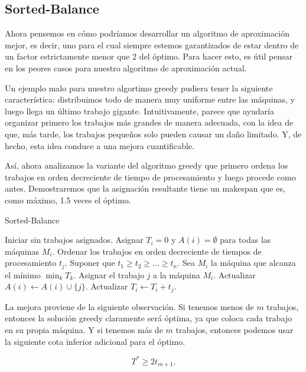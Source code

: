 \documentclass{report}
\begin{document}
	
	\subsection*{Sorted-Balance}
	
	Ahora pensemos en cómo podríamos desarrollar un algoritmo de aproximación mejor, es decir, uno para el cual siempre estemos garantizados de estar dentro de un factor estrictamente menor que 2 del óptimo. Para hacer esto, es útil pensar en los peores casos para nuestro algoritmo de aproximación actual.
	
	Un ejemplo malo para nuestro algortimo greedy pudiera tener la siguiente característica: distribuimos todo de manera muy uniforme entre las máquinas, y luego llega un último trabajo gigante. Intuitivamente, parece que ayudaría organizar primero los trabajos más grandes de manera adecuada, con la idea de que, más tarde, los trabajos pequeños solo pueden causar un daño limitado. Y, de hecho, esta idea conduce a una mejora cuantificable.
	
	Así, ahora analizamos la variante del algoritmo greedy que primero ordena los trabajos en orden decreciente de tiempo de procesamiento y luego procede como antes. Demostraremos que la asignación resultante tiene un makespan que es, como máximo, 1.5 veces el óptimo.
	
	\begin{algorithm}[H]
		\caption{Sorted-Balance}
			\State Iniciar sin trabajos asignados.
			\State Asignar \( T_i = 0 \) y \( A(i) = \emptyset \) para todas las máquinas \( M_i \).
			\State Ordenar los trabajos en orden decreciente de tiempos de procesamiento \( t_j \).
			\State Suponer que \( t_1 \geq t_2 \geq \dots \geq t_n \).
			\State Sea \( M_i \) la máquina que alcanza el mínimo \( \min_k T_k \).
			\State Asignar el trabajo \( j \) a la máquina \( M_i \).
			\State Actualizar \( A(i) \leftarrow A(i) \cup \{j\} \).
			\State Actualizar \( T_i \leftarrow T_i + t_j \).
			\EndFor
	\end{algorithm}
	
	La mejora proviene de la siguiente observación. Si tenemos menos de \( m \) trabajos, entonces la solución greedy claramente será óptima, ya que coloca cada trabajo en su propia máquina. Y si tenemos más de \( m \) trabajos, entonces podemos usar la siguiente cota inferior adicional para el óptimo.
	
	\begin{equation} \label{lem:lower-bound}
	  T^* \geq 2t_{m+1} .
	  	\end{equation}
	
\end{document}
